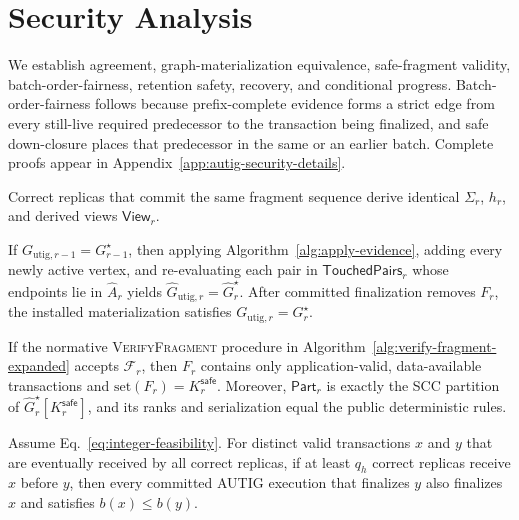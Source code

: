 \section{Security Analysis}
\label{sec:analysis}

We establish agreement, graph-materialization equivalence, safe-fragment
validity, batch-order-fairness, retention safety, recovery, and conditional
progress.  Batch-order-fairness follows because prefix-complete evidence forms
a strict edge from every still-live required predecessor to the transaction
being finalized, and safe down-closure places that predecessor in the same or
an earlier batch.  Complete proofs appear in
Appendix~\ref{app:autig-security-details}.

\begin{theorem}
\label{thm:state-agreement}
Correct replicas that commit the same fragment sequence derive identical
$\Sigma_r$, $h_r$, and derived views $\mathsf{View}_r$.
\end{theorem}

\begin{theorem}
\label{thm:incremental-equivalence}
If $G_{\mathrm{utig},r-1}=G_{r-1}^\star$, then applying
Algorithm~\ref{alg:apply-evidence}, adding every newly active vertex, and
re-evaluating each pair in $\mathsf{TouchedPairs}_r$ whose endpoints lie in
$\widehat A_r$ yields
$\widehat G_{\mathrm{utig},r}=\widehat G_r^\star$.  After committed
finalization removes $F_r$, the installed materialization satisfies
$G_{\mathrm{utig},r}=G_r^\star$.
\end{theorem}

\begin{theorem}
\label{thm:safe-fragment}
If the normative \textsc{VerifyFragment} procedure in
Algorithm~\ref{alg:verify-fragment-expanded} accepts $\mathcal F_r$, then
$F_r$ contains only application-valid, data-available transactions and
$\mathrm{set}(F_r)=K_r^{\mathsf{safe}}$.  Moreover, $\mathsf{Part}_r$ is
exactly the SCC partition of
$\widehat G_r^\star[K_r^{\mathsf{safe}}]$, and its ranks and serialization
equal the public deterministic rules.
\end{theorem}

\begin{theorem}
\label{thm:batch-fairness}
Assume Eq.~\eqref{eq:integer-feasibility}.  For distinct valid transactions
$x$ and $y$ that are eventually received by all correct replicas, if at least
$q_h$ correct replicas receive $x$ before $y$, then every committed AUTIG
execution that finalizes $y$ also finalizes $x$ and satisfies $b(x)\le b(y)$.
\end{theorem}

